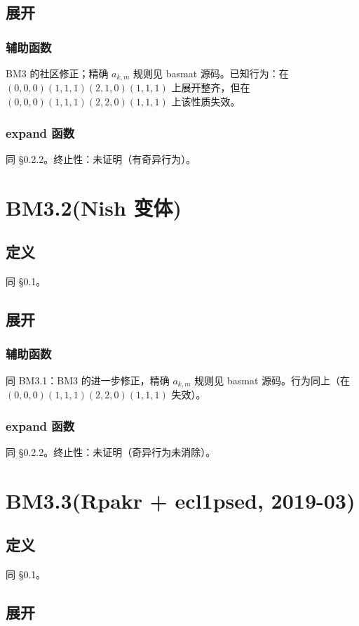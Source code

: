 \documentclass[UTF8]{ctexart}
\begin{document}
\subsection{展开}
\subsubsection{辅助函数}
BM3 的社区修正；精确 $a_{k,m}$ 规则见 basmat 源码。已知行为：在 $(0,0,0)\allowbreak(1,1,1)\allowbreak(2,1,0)\allowbreak(1,1,1)$ 上展开整齐，但在 $(0,0,0)\allowbreak(1,1,1)\allowbreak(2,2,0)\allowbreak(1,1,1)$ 上该性质失效。

\subsubsection{expand 函数}
同 \S 0.2.2。终止性：未证明（有奇异行为）。

\section{BM3.2(Nish 变体)}
\subsection{定义}
同 \S 0.1。

\subsection{展开}
\subsubsection{辅助函数}
同 BM3.1：BM3 的进一步修正，精确 $a_{k,m}$ 规则见 basmat 源码。行为同上（在 $(0,0,0)(1,1,1)(2,2,0)(1,1,1)$ 失效）。

\subsubsection{expand 函数}
同 \S 0.2.2。终止性：未证明（奇异行为未消除）。

\section{BM3.3(Rpakr + ecl1psed, 2019-03)}
\subsection{定义}
同 \S 0.1。

\subsection{展开}
\end{document}
